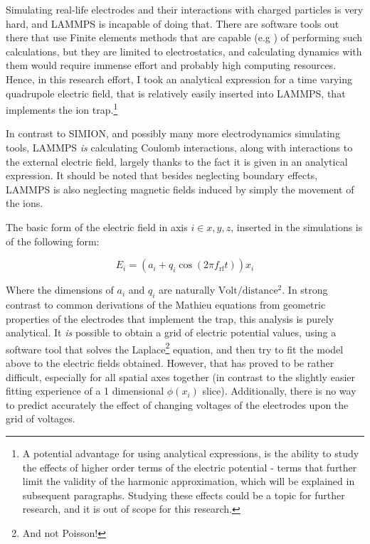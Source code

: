 Simulating real-life electrodes and their interactions with charged particles is very hard, and LAMMPS is incapable of doing that. There are software tools out there that use Finite elements methods that are capable (e.g \cite{FEniCS}) of performing such calculations, but they are limited to electrostatics, and calculating dynamics with them would require immense effort and probably high computing resources. Hence, in this research effort, I took an analytical expression for a time varying quadrupole electric field, that is relatively easily inserted into LAMMPS, that implements the ion trap.\footnote{A potential advantage for using analytical expressions, is the ability to study the effects of higher order terms of the electric potential - terms that further limit the validity of the harmonic approximation, which will be explained in subsequent paragraphs. Studying these effects could be a topic for further research, and it is out of scope for this research.}

In contrast to SIMION\cite{SIMION}, and possibly many more electrodynamics simulating tools, LAMMPS \emph{is} calculating Coulomb interactions, along with interactions to the external electric field, largely thanks to the fact it is given in an analytical expression. It should be noted that besides neglecting boundary effects, LAMMPS is also neglecting magnetic fields induced by simply the movement of the ions.

The basic form of the electric field in axis $i \in {x,y,z}$, inserted in the simulations is of the following form:

\begin{equation}
	E_i = (a_i + q_i \cos(2\pi f_\mathrm{rf} t)) x_i
	\label{eq:mathieu-source}
\end{equation}

Where the dimensions of $a_i$ and $q_i$ are naturally $\mathrm{Volt}/\mathrm{distance^2}$. In strong contrast to common derivations of the Mathieu equations from geometric properties of the electrodes that implement the trap, this analysis is purely analytical. It \emph{is} possible to obtain a grid of electric potential values, using a software tool that solves the Laplace\footnote{And not Poisson!} equation, and then try to fit the model above to the electric fields obtained. However, that has proved to be rather difficult, especially for all spatial axes together (in contrast to the slightly easier fitting experience of a 1 dimensional $\phi(x_i)$ slice). Additionally, there is no way to predict accurately the effect of changing voltages of the electrodes upon the grid of voltages.

